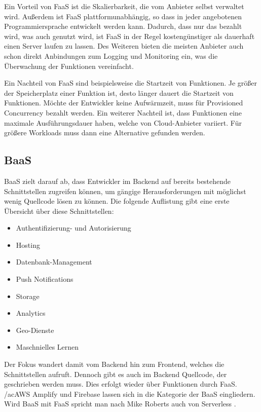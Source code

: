 Ein Vorteil von \ac{FaaS} ist die Skalierbarkeit, die vom Anbieter selbst verwaltet wird. Außerdem ist \ac{FaaS} plattformunabhängig, so dass in jeder angebotenen Programmiersprache entwickelt werden kann. Dadurch, dass nur das bezahlt wird, was auch genutzt wird, ist \ac{FaaS} in der Regel kostengünstiger als dauerhaft einen Server laufen zu lassen. Des Weiteren bieten die meisten Anbieter auch schon direkt Anbindungen zum Logging und Monitoring ein, was die Überwachung der Funktionen vereinfacht.

Ein Nachteil von \ac{FaaS} sind beispielsweise die Startzeit von Funktionen. Je größer der Speicherplatz einer Funktion ist, desto länger dauert die Startzeit von Funktionen. Möchte der Entwickler keine Aufwärmzeit, muss für Provisioned Concurrency bezahlt werden. Ein weiterer Nachteil ist, dass Funktionen eine maximale Ausführungsdauer haben, welche von Cloud-Anbieter variiert. Für größere Workloads muss dann eine Alternative gefunden werden.

\subsection{\acl{BaaS}}

\acf{BaaS} zielt darauf ab, dass Entwickler im Backend auf bereits bestehende Schnittstellen zugreifen können, um gängige Herausforderungen mit möglichst wenig Quellcode lösen zu können. Die folgende Auflistung gibt eine erste Übersicht über diese Schnittstellen:
\begin{itemize}
  \item Authentifizierung- und Autorisierung
  \item Hosting
  \item Datenbank-Management
  \item Push Notifications
  \item Storage
  \item Analytics
  \item Geo-Dienste
  \item Maschnielles Lernen
\end{itemize}

Der Fokus wandert damit vom Backend hin zum Frontend, welches die Schnittstellen aufruft. Dennoch gibt es auch im Backend Quellcode, der geschrieben werden muss. Dies erfolgt wieder über Funktionen durch \ac{FaaS}. /ac{AWS} Amplify und Firebase lassen sich in die Kategorie der \ac{BaaS} eingliedern. Wird \ac{BaaS} mit \ac{FaaS} spricht man nach Mike Roberts auch von Serverless \autocite{brandon2017serverless}.

